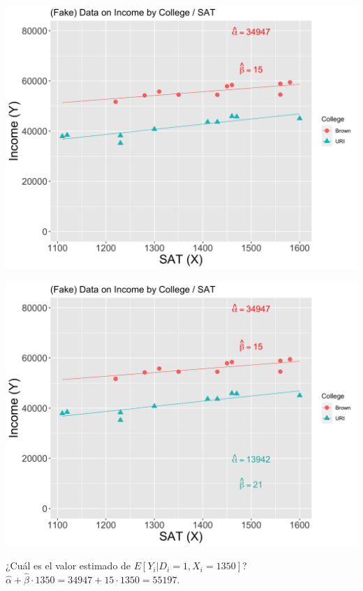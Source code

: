 \documentclass[11pt,handout,aspectratio=169]{beamer}
\newenvironment{wideitemize}{\itemize\addtolength{\itemsep}{10pt}}{\enditemize}
\begin{document}
\begin{frame}
	\centering
\includegraphics[scale=0.1]{fake-sat-with-trend-brown-betas.png}
\end{frame}

\begin{frame}
	\centering
	\includegraphics[scale=0.1]{fake-sat-with-trend-both-betas.png}
	
	\pause
	\begin{wideitemize}
		\item
		¿Cuál es el valor estimado de $E[Y_i | D_i = 1, X_i = 1350]$? \pause $\hat\alpha + \hat\beta \cdot 1350 = 34947 + 15 \cdot 1350 = 55197$. 
	\end{wideitemize}
\end{frame}
\end{document}
